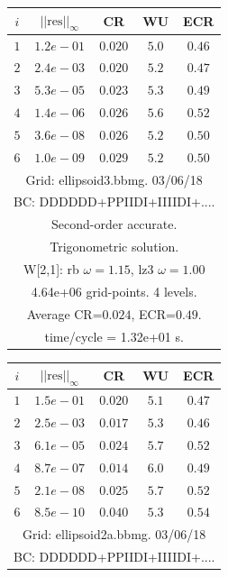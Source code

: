 \begin{table}[hbt]
\begin{center}
{\tablefontsize
\begin{tabular}{|c|c|c|c|c|} \hline 
 $i$   & $\vert\vert\mbox{res}\vert\vert_\infty$  &  CR     &  WU    & ECR  \\   \hline 
 $ 1$  & $ 1.2e-01$ & $0.020$ & $ 5.0$ & $0.46$ \\ 
 $ 2$  & $ 2.4e-03$ & $0.020$ & $ 5.2$ & $0.47$ \\ 
 $ 3$  & $ 5.3e-05$ & $0.023$ & $ 5.3$ & $0.49$ \\ 
 $ 4$  & $ 1.4e-06$ & $0.026$ & $ 5.6$ & $0.52$ \\ 
 $ 5$  & $ 3.6e-08$ & $0.026$ & $ 5.2$ & $0.50$ \\ 
 $ 6$  & $ 1.0e-09$ & $0.029$ & $ 5.2$ & $0.50$ \\ 
\hline 
\multicolumn{5}{|c|}{Grid: ellipsoid3.bbmg. 03/06/18}  \\
\multicolumn{5}{|c|}{BC: DDDDDD+PPIIDI+IIIIDI+....}  \\
\multicolumn{5}{|c|}{Second-order accurate.}  \\
\multicolumn{5}{|c|}{Trigonometric solution.}  \\
\multicolumn{5}{|c|}{W[2,1]: rb $\omega=1.15$, lz3 $\omega=1.00$}  \\
\multicolumn{5}{|c|}{4.64e+06 grid-points. 4 levels.}  \\
\multicolumn{5}{|c|}{Average CR=$0.024$, ECR=$0.49$.}  \\
\multicolumn{5}{|c|}{time/cycle = 1.32e+01 s.}  \\
\hline 
\end{tabular}
\begin{tabular}{|c|c|c|c|c|} \hline 
 $i$   & $\vert\vert\mbox{res}\vert\vert_\infty$  &  CR     &  WU    & ECR  \\   \hline 
 $ 1$  & $ 1.5e-01$ & $0.020$ & $ 5.1$ & $0.47$ \\ 
 $ 2$  & $ 2.5e-03$ & $0.017$ & $ 5.3$ & $0.46$ \\ 
 $ 3$  & $ 6.1e-05$ & $0.024$ & $ 5.7$ & $0.52$ \\ 
 $ 4$  & $ 8.7e-07$ & $0.014$ & $ 6.0$ & $0.49$ \\ 
 $ 5$  & $ 2.1e-08$ & $0.025$ & $ 5.7$ & $0.52$ \\ 
 $ 6$  & $ 8.5e-10$ & $0.040$ & $ 5.3$ & $0.54$ \\ 
\hline 
\multicolumn{5}{|c|}{Grid: ellipsoid2a.bbmg. 03/06/18}  \\
\multicolumn{5}{|c|}{BC: DDDDDD+PPIIDI+IIIIDI+....}  \\

\end{tabular}}
\end{center}
\end{table}
